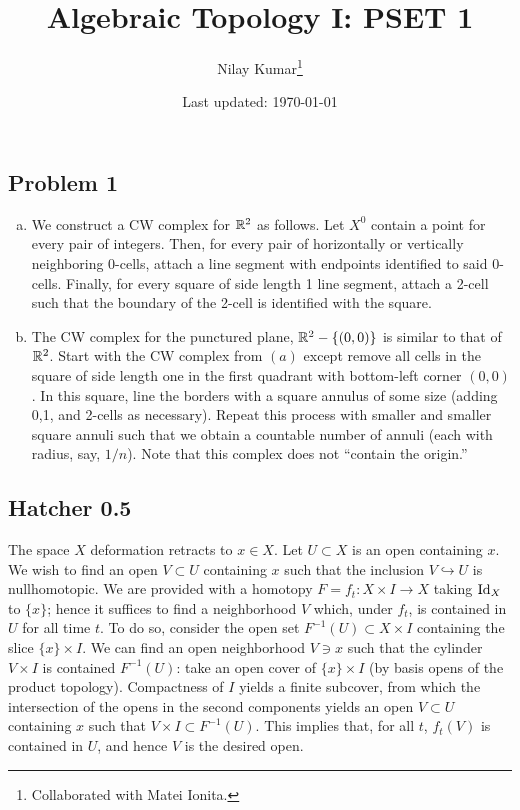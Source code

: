 \documentclass{../mathnotes}
\title{Algebraic Topology I: PSET 1}
\author{Nilay Kumar\footnote{Collaborated with Matei Ionita.}}
\date{Last updated: \today}
\begin{document}
\maketitle

\subsection*{Problem 1}
\begin{enumerate}[(a)]
    \item We construct a CW complex for $\mathbb{R}^2$ as follows. Let $X^0$ contain a point for
        every pair of integers. Then, for every pair of horizontally or vertically neighboring
        0-cells, attach a line segment with endpoints identified to said 0-cells. Finally,
        for every square of side length 1 line segment, attach a 2-cell such that the boundary
        of the 2-cell is identified with the square.
    \item The CW complex for the punctured plane, $\mathbb{R}^2-\{(0,0)\}$ is similar to that of $\mathbb{R}^2$.
        Start with the CW complex from $(a)$ except remove all cells in the square of side length
        one in the first quadrant with bottom-left corner $(0,0)$. In this square, line the
        borders with a square annulus of some size (adding 0,1, and 2-cells as necessary). Repeat
        this process with smaller and smaller square annuli such that we obtain a countable number
        of annuli (each with radius, say, $1/n$). Note that this complex does not ``contain the
        origin.''
\end{enumerate}

\subsection*{Hatcher 0.5}
The space $X$ deformation retracts to $x\in X$. Let $U\subset X$ is an open containing $x$.
We wish to find an open $V\subset U$ containing $x$ such that the inclusion $V\hookrightarrow U$
is nullhomotopic. We are provided with a homotopy $F=f_t:X\times I\to X$ taking $\operatorname{Id}_X$ to $\{x\}$;
hence it suffices to find a neighborhood $V$ which, under $f_t$, is contained in $U$ for all time $t$.
To do so, consider the open set $F^{-1}(U)\subset X\times I$ containing the slice $\{x\}\times I$. 
We can find an open neighborhood $V\ni x$ such that the cylinder $V\times I$ is contained $F^{-1}(U)$:
take an open cover of $\{x\}\times I$ (by basis opens of the product topology). Compactness of $I$ yields
a finite subcover, from which the intersection of the opens in the second components yields an open
$V\subset U$ containing $x$ such that $V\times I\subset F^{-1}(U)$. This implies that, for all $t$,
$f_t(V)$ is contained in $U$, and hence $V$ is the desired open.
\end{document}
